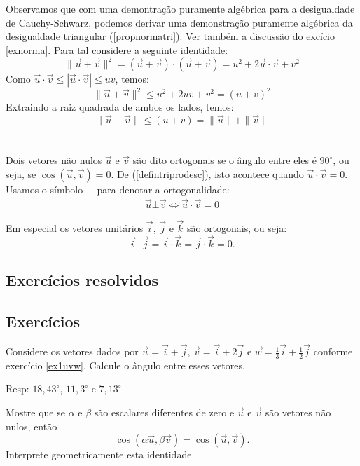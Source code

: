 Observamos que com uma demontração puramente algébrica para a desigualdade de Cauchy-Schwarz, podemos derivar uma demonstração puramente algébrica da \underline{desigualdade triangular} (\ref{propnormatri}). Ver também a discussão do excício \ref{exnorma}. Para tal considere a seguinte identidade:
$$\|\vec{u}+\vec{v}\|^2=\left(\vec{u}+\vec{v}\right)\cdot \left(\vec{u}+\vec{v}\right) = u^2+2\vec{u}\cdot\vec{v}+v^2$$
Como $\vec{u}\cdot\vec{v}\leq |\vec{u}\cdot\vec{v}|\leq uv$, temos:
$$\|\vec{u}+\vec{v}\|^2\leq u^2+2uv+v^2=(u+v)^2$$
Extraindo a raiz quadrada de ambos os lados, temos:
$$\|\vec{u}+\vec{v}\|\leq (u+v)=\|\vec{u}\|+\|\vec{v}\|$$
\\~\\
Dois vetores não nulos $\vec{u}$ e $\vec{v}$ são dito ortogonais se o ângulo entre eles é $90^\circ$, ou seja, se $\cos\left(\vec{u},\vec{v}\right)=0$. De (\ref{defintriprodesc}), isto acontece quando $\vec{u}\cdot\vec{v}=0$. Usamos o símbolo $\bot$ para denotar a ortogonalidade:
\begin{eqnarray}\vec{u}\bot \vec{v}\Longleftrightarrow \vec{u}\cdot\vec{v}=0\label{deforto}
\end{eqnarray}

Em especial os vetores unitários $\vec{i}$, $\vec{j}$ e $\vec{k}$ são ortogonais, ou seja: $$\vec{i}\cdot \vec{j}=\vec{i}\cdot \vec{k}=\vec{j}\cdot \vec{k}=0.$$

\subsection*{Exercícios resolvidos}

\construirExeresol

\subsection*{Exercícios}
\begin{exer} Considere os vetores dados por $\vec{u}=\vec{i}+\vec{j}$, $\vec{v}=\vec{i}+2\vec{j}$ e $\vec{w}=\frac{1}{3}\vec{i}+\frac{1}{2}\vec{j}$ conforme exercício \ref{ex1uvw}. Calcule o ângulo entre esses vetores.
\end{exer}
Resp: $18,43^\circ$, $11,3^\circ$ e  $7,13^\circ$
\begin{exer} Mostre que se $\alpha$ e $\beta$ são escalares diferentes de zero e $\vec{u}$ e $\vec{v}$ são vetores não nulos, então $$\cos\left(\alpha\vec{u},\beta\vec{v}\right)=\cos\left(\vec{u},\vec{v}\right).$$
Interprete geometricamente esta identidade.
\end{exer}


